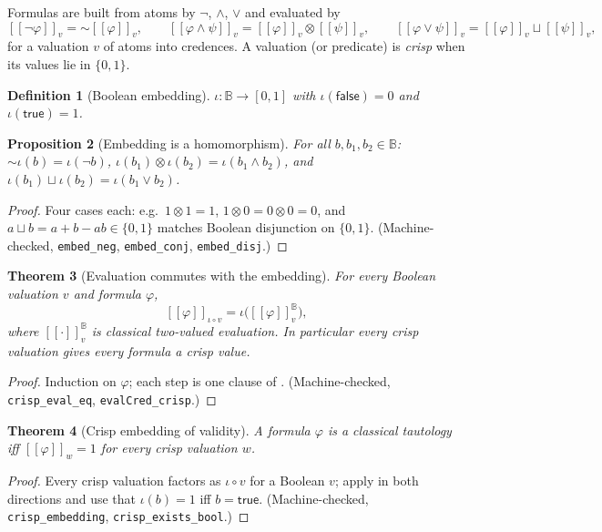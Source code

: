 \documentclass[11pt,a4paper]{article}
\newtheorem{theorem}{Theorem}[section]
\newtheorem{proposition}[theorem]{Proposition}
\newtheorem{definition}[theorem]{Definition}
\newcommand{\negc}{\mathord{\sim}}
\newcommand{\conjc}{\otimes}
\newcommand{\disjc}{\sqcup}
\newcommand{\Bool}{\mathbb{B}}
\newcommand{\evalc}[2]{[\![ {#2} ]\!]_{#1}}
\begin{document}
Formulas are built from atoms by $\neg$, $\wedge$, $\vee$ and evaluated
by
\[
  \evalc{v}{\neg\varphi} = \negc \evalc{v}{\varphi}, \qquad
  \evalc{v}{\varphi \wedge \psi} =
    \evalc{v}{\varphi} \conjc \evalc{v}{\psi}, \qquad
  \evalc{v}{\varphi \vee \psi} =
    \evalc{v}{\varphi} \disjc \evalc{v}{\psi},
\]
for a valuation $v$ of atoms into credences.
A valuation (or predicate) is \emph{crisp} when its values lie in
$\{0,1\}$.

\begin{definition}[Boolean embedding]
\label{def:embed}
$\iota : \Bool \to [0,1]$ with $\iota(\mathsf{false}) = 0$ and
$\iota(\mathsf{true}) = 1$.
\end{definition}

\begin{proposition}[Embedding is a homomorphism]
\label{prop:embed-hom}
For all $b, b_1, b_2 \in \Bool$:
$\negc \iota(b) = \iota(\lnot b)$,
$\iota(b_1) \conjc \iota(b_2) = \iota(b_1 \wedge b_2)$, and
$\iota(b_1) \disjc \iota(b_2) = \iota(b_1 \vee b_2)$.
\end{proposition}
\begin{proof}
Four cases each: e.g.\ $1 \conjc 1 = 1$, $1 \conjc 0 = 0 \conjc 0 = 0$,
and $a \disjc b = a + b - ab \in \{0,1\}$ matches Boolean disjunction
on $\{0,1\}$.
(Machine-checked, \texttt{embed\_neg}, \texttt{embed\_conj},
\texttt{embed\_disj}.)
\end{proof}

\begin{theorem}[Evaluation commutes with the embedding]
\label{thm:crisp-eval}
For every Boolean valuation $v$ and formula $\varphi$,
\[
  \evalc{\iota \circ v}{\varphi} = \iota\bigl(\evalc{v}{\varphi}^{\Bool}\bigr),
\]
where $\evalc{v}{\cdot}^{\Bool}$ is classical two-valued evaluation.
In particular every crisp valuation gives every formula a crisp value.
\end{theorem}
\begin{proof}
Induction on $\varphi$; each step is one clause of
.
(Machine-checked, \texttt{crisp\_eval\_eq}, \texttt{evalCred\_crisp}.)
\end{proof}

\begin{theorem}[Crisp embedding of validity]
\label{thm:crisp-embedding}
A formula $\varphi$ is a classical tautology iff
$\evalc{w}{\varphi} = 1$ for every crisp valuation $w$.
\end{theorem}
\begin{proof}
Every crisp valuation factors as $\iota \circ v$ for a Boolean $v$;
apply  in both directions and use that
$\iota(b) = 1$ iff $b = \mathsf{true}$.
(Machine-checked, \texttt{crisp\_embedding},
\texttt{crisp\_exists\_bool}.)
\end{proof}
\end{document}
